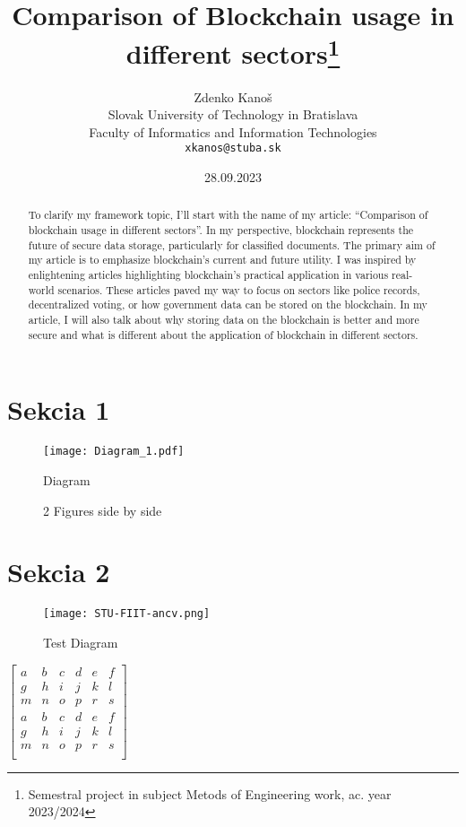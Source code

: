 \documentclass[10pt,english,a4paper]{article}
\title{Comparison of Blockchain usage in different sectors\thanks{Semestral project in subject Metods of Engineering work, ac. year 2023/2024}} %
\author{Zdenko Kanoš\\[2pt]
	{\small Slovak University of Technology in Bratislava}\\
	{\small Faculty of Informatics and Information Technologies}\\
	{\small \texttt{xkanos@stuba.sk}}
	}
\date{\small 28.09.2023} %
\begin{document}
\maketitle

\begin{abstract}
To clarify my framework topic, I'll start with the name of my article: “Comparison of
blockchain usage in different sectors”. In my perspective, blockchain represents the future
of secure data storage, particularly for classified documents. The primary aim of my article is
to emphasize blockchain’s current and future utility. I was inspired by enlightening articles
highlighting blockchain's practical application in various real-world scenarios. These articles
paved my way to focus on sectors like police records, decentralized voting, or how
government data can be stored on the blockchain. In my article, I will also talk about why
storing data on the blockchain is better and more secure and what is different about the
application of blockchain in different sectors.
\end{abstract}

\section{Sekcia 1}
 \lipsum[1-3]
  \begin{figure}
  \centering
   \texttt{[image: Diagram\_1.pdf]}
  \centering
  \caption{Diagram}
 \end{figure}
 \lipsum[1-2]
 
 \begin{figure}%
    \centering
    \qquad
    \caption{2 Figures side by side}%
    \label{fig:example}%
\end{figure}
 
 \lipsum[1-3]

 \section{Sekcia 2}
 \lipsum[1-2]
 \begin{wrapfigure}{r}{0.5\textwidth}
  \centering
  \texttt{[image: STU-FIIT-ancv.png]} %
  \caption{Test Diagram}
\end{wrapfigure} 
 \lipsum[1-4]
 
$\begin{bmatrix}
  a & b & c & d & e &f\\
  g & h & i & j & k &l \\
  m & n & o & p & r &s\\
   a & b & c & d & e &f\\
  g & h & i & j & k &l \\
  m & n & o & p & r &s\\

  
\end{bmatrix}$



 
 

\end{document}
